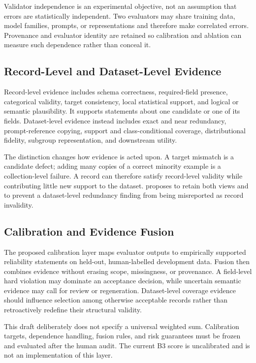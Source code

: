 Validator independence is an experimental objective, not an assumption that
errors are statistically independent. Two evaluators may share training data,
model families, prompts, or representations and therefore make correlated
errors. Provenance and evaluator identity are retained so calibration and
ablation can measure such dependence rather than conceal it.

\subsection{Record-Level and Dataset-Level Evidence}
\label{sec:record-dataset-evidence}

Record-level evidence includes schema correctness, required-field presence,
categorical validity, target consistency, local statistical support, and
logical or semantic plausibility. It supports statements about one candidate
or one of its fields. Dataset-level evidence instead includes exact and near
redundancy, prompt-reference copying, support and class-conditional coverage,
distributional fidelity, subgroup representation, and downstream utility.

The distinction changes how evidence is acted upon. A target mismatch is a
candidate defect; adding many copies of a correct minority example is a
collection-level failure. A record can therefore satisfy record-level validity
while contributing little new support to the dataset. \rcqasyn{} proposes to
retain both views and to prevent a dataset-level redundancy finding from being
misreported as record invalidity.

\subsection{Calibration and Evidence Fusion}

The proposed calibration layer maps evaluator outputs to empirically supported
reliability statements on held-out, human-labelled development data. Fusion
then combines evidence without erasing scope, missingness, or provenance. A
field-level hard violation may dominate an acceptance decision, while
uncertain semantic evidence may call for review or regeneration. Dataset-level
coverage evidence should influence selection among otherwise acceptable
records rather than retroactively redefine their structural validity.

This draft deliberately does not specify a universal weighted sum. Calibration
targets, dependence handling, fusion rules, and risk guarantees must be frozen
and evaluated after the human audit. The current B3 score is uncalibrated and
is not an implementation of this layer.

